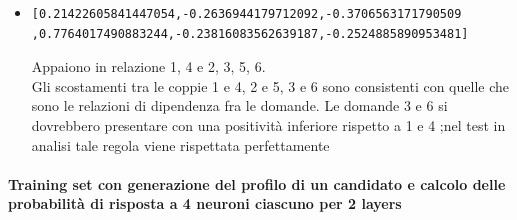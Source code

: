 \begin{itemize}
\item \begin{verbatim}[0.21422605841447054,-0.2636944179712092,-0.3706563171790509
,0.7764017490883244,-0.23816083562639187,-0.2524885890953481]\end{verbatim}
Appaiono in relazione 1, 4 e 2, 3, 5, 6.\\
Gli scostamenti tra le coppie  1  e 4, 2 e 5, 3 e 6 sono consistenti con quelle che sono le relazioni di dipendenza fra le domande.
Le domande 3 e 6 si dovrebbero presentare con una positivit\`a inferiore rispetto a 1 e 4 ;nel test in analisi tale regola viene rispettata perfettamente
\end{itemize}


\paragraph{Training set con generazione del profilo di un candidato e calcolo delle probabilit\`a di risposta a 4 neuroni ciascuno per 2 layers}\mbox{}
\label{Training set con generazione del profilo di un candidato e calcolo delle probabilita di risposta a 4 neuroni}
\\
\noindent
